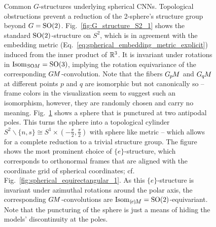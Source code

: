 \begin{figure}
\begin{subfigure}[b]{0.48\textwidth}
{        }
        \label{fig:G_structure_S2_2}
    \end{subfigure}
    \vspace*{2ex}
    \caption{\small
        Common $G$-structures underlying spherical CNNs.
        Topological obstructions prevent a reduction of the 2-sphere's structure group beyond $G=\operatorname{SO}(2)$.
        Fig.~\ref{fig:G_structure_S2_1} shows the standard $\operatorname{SO}(2)$-structure on $S^2$, which is in agreement with the embedding metric (Eq.~\eqref{eq:spherical_embedding_metric_explicit}) induced from the inner product of $\mathbb{R}^3$.
        It is invariant under rotations in $\protect\operatorname{Isom}_{\mkern1mu\operatorname{SO}\mkern-3.6muM} = \operatorname{SO}(3)$, implying the rotation equivariance of the corresponding $G\mkern-1.4muM$-convolution.
        Note that the fibers $G_{\mkern-1.3mu p}\mkern-1.2muM$ and $G_{\mkern-1.3mu q}\mkern-1.3muM$ at different points $p$ and $q$ are isomorphic but not canonically so -- frame colors in the visualization seem to suggest such an isomorphism, however, they are randomly chosen and carry no meaning.
        Fig.~\ref{fig:G_structure_S2_2} shows a sphere that is punctured at two antipodal poles.
        This turns the sphere into a topological cylinder $S^2 \backslash \{n,s\} \cong S^1\times(-\frac{\pi}{2},\frac{\pi}{2})$ with sphere like metric -- which allows for a complete reduction to a trivial structure group.
        The figure shows the most prominent choice of $\{e\}$-structure, which corresponds to orthonormal frames that are aligned with the coordinate grid of spherical coordinates; cf. Fig.~\ref{fig:spherical_equirectangular_1}.
        As this $\{e\}$-structure is invariant under azimuthal rotations around the polar axis, the corresponding $G\mkern-1.4muM$-convolutions are $\protect\IsomeM = \SO2$-equivariant.
        Note that the puncturing of the sphere is just a means of hiding the models' discontinuity at the poles.
    }
    \label{fig:G_structures_S2_main}
\end{figure}
